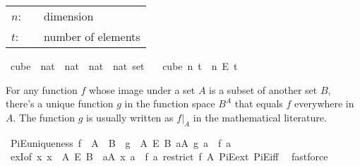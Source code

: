 \begin{isabellebody}
\begin{isamarkuptext}
\begin{tabular}{lcp{8cm}}
$n$:& \isa{nat}& dimension\\
$t$:& \isa{nat}& number of elements\\
\end{tabular}%
\end{isamarkuptext}\isamarkuptrue%
\isamarkupfalse%
\ cube\ {\isacharcolon}{\kern0pt}{\isacharcolon}{\kern0pt}\ {\isachardoublequoteopen}nat\ {\isasymRightarrow}\ nat\ {\isasymRightarrow}\ {\isacharparenleft}{\kern0pt}nat\ {\isasymRightarrow}\ nat{\isacharparenright}{\kern0pt}\ set{\isachardoublequoteclose}\isanewline
\ \ \ {\isachardoublequoteopen}cube\ n\ t\ {\isasymequiv}\ {\isacharbraceleft}{\kern0pt}{\isachardot}{\kern0pt}{\isachardot}{\kern0pt}{\isacharless}{\kern0pt}n{\isacharbraceright}{\kern0pt}\ {\isasymrightarrow}\isactrlsub E\ {\isacharbraceleft}{\kern0pt}{\isachardot}{\kern0pt}{\isachardot}{\kern0pt}{\isacharless}{\kern0pt}t{\isacharbraceright}{\kern0pt}{\isachardoublequoteclose}%
\begin{isamarkuptext}%
For any function $f$ whose image under a set $A$ is a subset of another set $B$, there's a unique function $g$ in the function space $B^A$ that equals $f$ everywhere in $A$.
The function $g$ is usually written as $f|_A$ in the mathematical literature.%
\end{isamarkuptext}\isamarkuptrue%
\isamarkupfalse%
\ PiE{\isacharunderscore}{\kern0pt}uniqueness{\isacharcolon}{\kern0pt}\ {\isachardoublequoteopen}f\ {\isacharbackquote}{\kern0pt}\ A\ {\isasymsubseteq}\ B\ {\isasymLongrightarrow}\ {\isasymexists}{\isacharbang}{\kern0pt}g\ {\isasymin}\ A\ {\isasymrightarrow}\isactrlsub E\ B{\isachardot}{\kern0pt}\ {\isasymforall}a{\isasymin}A{\isachardot}{\kern0pt}\ g\ a\ {\isacharequal}{\kern0pt}\ f\ a{\isachardoublequoteclose}\isanewline
%
\isadelimproof
\ \ %
\endisadelimproof
%
\isatagproof
{}\isamarkupfalse%
\ exI{\isacharbrackleft}{\kern0pt}of\ {\isachardoublequoteopen}{\isasymlambda}x{\isachardot}{\kern0pt}\ x\ {\isasymin}\ A\ {\isasymrightarrow}\isactrlsub E\ B\ {\isasymand}\ {\isacharparenleft}{\kern0pt}{\isasymforall}a{\isasymin}A{\isachardot}{\kern0pt}\ x\ a\ {\isacharequal}{\kern0pt}\ f\ a{\isacharparenright}{\kern0pt}{\isachardoublequoteclose}\ {\isachardoublequoteopen}restrict\ f\ A{\isachardoublequoteclose}{\isacharbrackright}{\kern0pt}\ PiE{\isacharunderscore}{\kern0pt}ext\ PiE{\isacharunderscore}{\kern0pt}iff\ \isamarkupfalse%
\ fastforce%
\endisatagproof
{\isafoldproof}%
%

\end{isabellebody}
